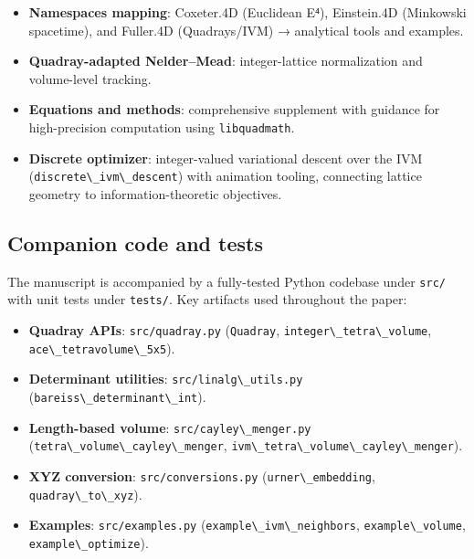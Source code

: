 \documentclass[
  10pt,
]{article}
\newcommand{\passthrough}[1]{#1}
\providecommand{\tightlist}{%
  \setlength{\itemsep}{0pt}\setlength{\parskip}{0pt}}
\begin{document}
\begin{itemize}
\tightlist
\item
  \textbf{Namespaces mapping}: Coxeter.4D (Euclidean E⁴), Einstein.4D
  (Minkowski spacetime), and Fuller.4D (Quadrays/IVM) → analytical tools
  and examples.
\item
  \textbf{Quadray-adapted Nelder--Mead}: integer-lattice normalization
  and volume-level tracking.
\item
  \textbf{Equations and methods}: comprehensive supplement with guidance
  for high-precision computation using
  \passthrough{\lstinline!libquadmath!}.
\item
  \textbf{Discrete optimizer}: integer-valued variational descent over
  the IVM (\passthrough{\lstinline!discrete\_ivm\_descent!}) with
  animation tooling, connecting lattice geometry to
  information-theoretic objectives.
\end{itemize}

\hypertarget{companion-code-and-tests}{%
\subsection{Companion code and tests}\label{companion-code-and-tests}}

The manuscript is accompanied by a fully-tested Python codebase under
\passthrough{\lstinline!src/!} with unit tests under
\passthrough{\lstinline!tests/!}. Key artifacts used throughout the
paper:

\begin{itemize}
\tightlist
\item
  \textbf{Quadray APIs}: \passthrough{\lstinline!src/quadray.py!}
  (\passthrough{\lstinline!Quadray!},
  \passthrough{\lstinline!integer\_tetra\_volume!},
  \passthrough{\lstinline!ace\_tetravolume\_5x5!}).
\item
  \textbf{Determinant utilities}:
  \passthrough{\lstinline!src/linalg\_utils.py!}
  (\passthrough{\lstinline!bareiss\_determinant\_int!}).
\item
  \textbf{Length-based volume}:
  \passthrough{\lstinline!src/cayley\_menger.py!}
  (\passthrough{\lstinline!tetra\_volume\_cayley\_menger!},
  \passthrough{\lstinline!ivm\_tetra\_volume\_cayley\_menger!}).
\item
  \textbf{XYZ conversion}: \passthrough{\lstinline!src/conversions.py!}
  (\passthrough{\lstinline!urner\_embedding!},
  \passthrough{\lstinline!quadray\_to\_xyz!}).
\item
  \textbf{Examples}: \passthrough{\lstinline!src/examples.py!}
  (\passthrough{\lstinline!example\_ivm\_neighbors!},
  \passthrough{\lstinline!example\_volume!},
  \passthrough{\lstinline!example\_optimize!}).
\end{itemize}
\end{document}
